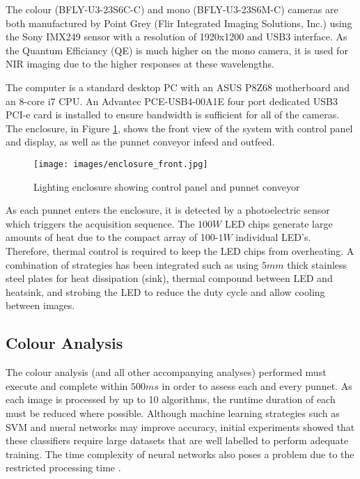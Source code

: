 \documentclass[conference]{IEEEtran}
\begin{document}
The colour (BFLY-U3-23S6C-C) and mono (BFLY-U3-23S6M-C) cameras are both manufactured by Point Grey (Flir Integrated Imaging Solutions, Inc.) using the Sony IMX249 sensor with a resolution of 1920x1200 and USB3 interface. As the Quantum Efficiancy (QE) is much higher on the mono camera, it is used for NIR imaging due to the higher responses at these wavelengths.

The computer is a standard desktop PC with an ASUS P8Z68 motherboard and an 8-core i7 CPU. An Advantec PCE-USB4-00A1E four port dedicated USB3 PCI-e card is installed to ensure bandwidth is sufficient for all of the cameras. The enclosure, in Figure \ref{fig:enclosure_front}, shows the front view of the system with control panel and display, as well as the punnet conveyor infeed and outfeed. 

\begin{figure}[h]
	\centering
	\texttt{[image: images/enclosure\_front.jpg]}
	\caption{Lighting enclosure showing control panel and punnet conveyor}
	\label{fig:enclosure_front}
\end{figure}


As each punnet enters the enclosure, it is detected by a photoelectric sensor which triggers the acquisition sequence. The $100W$ LED chips generate large amounts of heat due to the compact array of 100-$1W$ individual LED's. Therefore, thermal control is required to keep the LED chips from overheating. A combination of strategies has been integrated such as using $5mm$ thick stainless steel plates for heat dissipation (sink), thermal compound between LED and heatsink, and strobing the LED to reduce the duty cycle and allow cooling between images.   



\subsection{Colour Analysis}
\label{sec:colour_analysis}

The colour analysis (and all other accompanying analyses) performed must execute and complete within $500ms$ in order to assess each and every punnet. As each image is processed by up to 10 algorithms, the runtime duration of each must be reduced where possible. Although machine learning strategies such as SVM and nueral networks may improve accuracy, initial experiments showed that these classifiers require large datasets that are well labelled to perform adequate training. The time complexity of neural networks also poses a problem due to the restricted processing time \cite{he}\cite{angiulli}. 
\end{document}

